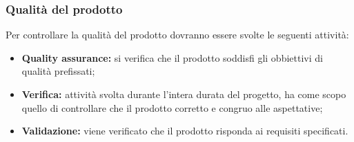 \subsubsection{Qualità del prodotto}
Per controllare la qualità del prodotto dovranno essere svolte le seguenti attività:
\begin{itemize}
	\item \textbf{Quality assurance:} si verifica che il prodotto soddisfi gli obbiettivi di qualità prefissati;
	\item \textbf{Verifica:} attività svolta durante l'intera durata del progetto, ha come scopo quello di controllare che il prodotto corretto e congruo alle aspettative;
	\item \textbf{Validazione:} viene verificato che il prodotto risponda ai requisiti specificati.
\end{itemize}

